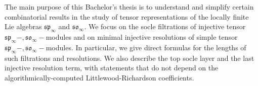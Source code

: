 \documentclass[main.tex]{subfiles}
\begin{document}
The main purpose of this Bachelor's thesis is to understand and simplify certain combinatorial results in the study of tensor representations of the locally finite Lie algebras $\mathfrak{sp}_\infty$ and $\mathfrak{so}_\infty$. We focus on the socle filtrations of injective tensor $\mathfrak{sp}_\infty-, \mathfrak{so}_\infty-$modules and on minimal injective resolutions of simple tensor $\mathfrak{sp}_\infty-, \mathfrak{so}_\infty-$modules. In particular, we give direct formulas for the lengths of such filtrations and resolutions. We also describe the top socle layer and the last injective resolution term, with statements that do not depend on the algorithmically-computed Littlewood-Richardson coefficients.
\end{document}
